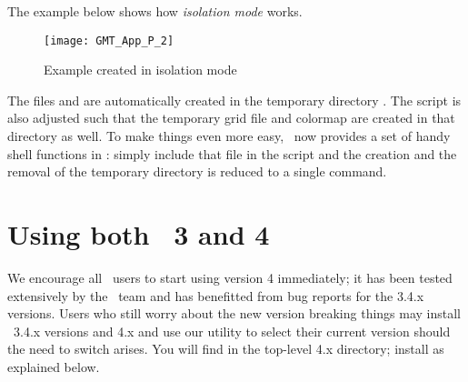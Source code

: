 The example below shows how \emph{isolation mode} works.


\begin{figure}[h]
\centering
\texttt{[image: GMT\_App\_P\_2]}
\caption{Example created in isolation mode}
\label{fig:GMT_App_P_2}
\end{figure}

The files  and  are automatically created
in the temporary directory . The script is also adjusted such
that the temporary grid file  and colormap  are created
in that directory as well. To make things even more easy, \GMT\ now provides a set of
handy shell functions in : simply include that file
in the script and the creation and the removal of the temporary directory is reduced to a single command.


\section{Using both \gmt\ 3 and 4}

We encourage all \GMT\ users to start using version 4 immediately; it has been tested extensively by
the \GMT\ team and has benefitted from bug reports for the 3.4.x versions.  Users who still worry about the
new version breaking things may install \GMT\ 3.4.x versions and 4.x and use our utility 
to select their current version should the need to switch arises.  You will find 
in the top-level \GMT 4.x directory; install as explained below.

